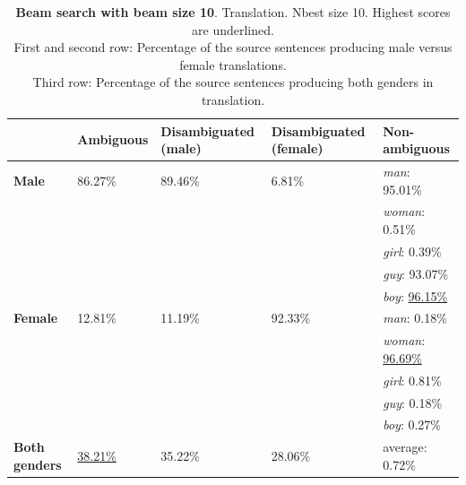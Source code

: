 \begin{table}[!htb]

    \begin{subtable}{\textwidth}
        \centering
        \begin{tabularx}{\linewidth}{|X|XXXX|}
            \hline
             & \textbf{Ambiguous} & \textbf{Disambiguated (male)} & \textbf{Disambiguated (female)} & \textbf{Non-ambiguous} \\ \hline
             \textbf{Male} & 86.27\% & 89.46\% & 6.81\% & \textit{man}: 95.01\% \\
             &&&& \textit{woman}: 0.51\% \\
             &&&& \textit{girl}: 0.39\% \\
             &&&& \textit{guy}: 93.07\% \\
             &&&& \textit{boy}: \underline{96.15\%} \\ \hline
             \textbf{Female} & 12.81\% & 11.19\% & 92.33\% & \textit{man}: 0.18\% \\ 
             &&&& \textit{woman}: \underline{96.69\%} \\
             &&&& \textit{girl}: 0.81\% \\
             &&&& \textit{guy}: 0.18\% \\
             &&&& \textit{boy}: 0.27\% \\\hline
             \textbf{Both genders} & \underline{38.21\%} & 35.22\% & 28.06\% & average: 0.72\% \\ \hline
        \end{tabularx}
        \caption{\textbf{Beam search with beam size 10}. Translation. Nbest size 10. Highest scores are underlined. \\ First and second row: Percentage of the source sentences producing male versus female translations. \\ Third row: Percentage of the source sentences producing both genders in translation.}
        \label{tab:gender_percent_10}
    \end{subtable}


\end{table}
